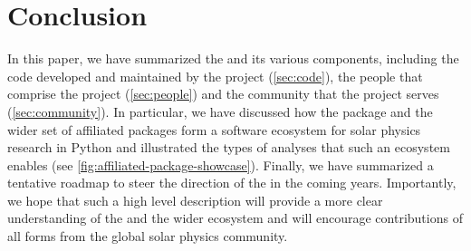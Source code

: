 \section{Conclusion}
\label{sec:conclusion}

In this paper, we have summarized the \sunpyproj and its various components, including the code developed and maintained by the project (\autoref{sec:code}), the people that comprise the project (\autoref{sec:people}) and the community that the project serves (\autoref{sec:community}).
In particular, we have discussed how the \sunpypkg package and the wider set of affiliated packages form a software ecosystem for solar physics research in Python and illustrated the types of analyses that such an ecosystem enables (see \autoref{fig:affiliated-package-showcase}).
Finally, we have summarized a tentative roadmap to steer the direction of the \sunpyproj in the coming years.
Importantly, we hope that such a high level description will provide a more clear understanding of the \sunpyproj and the wider ecosystem and will encourage contributions of all forms from the global solar physics community.
